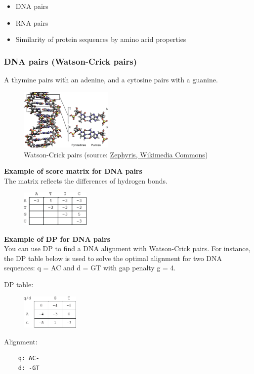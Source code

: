 \begin{itemize}
\item DNA pairs
\item RNA pairs
\item Similarity of protein sequences by amino acid properties
\end{itemize}

%
%
\subsubsection*{DNA pairs (Watson-Crick pairs)}
A thymine pairs with an adenine, and a cytosine pairs with a guanine.

\begin{figure}[H]
  \centering
      \includegraphics[width=0.4\textwidth]{fig03/dna_watson_crick_pair.png}
  \caption{Watson-Crick pairs (source: \href{https://commons.wikimedia.org/w/index.php?curid=15027555}{Zephyris, Wikimedia Commons})}
\end{figure}

\noindent \textbf{Example of score matrix for DNA pairs} \\
\noindent The matrix reflects the differences of hydrogen bonds.

\begin{figure}[H]
  \centering
      \includegraphics[width=0.3\textwidth]{fig03/example_watson_crick_score_matrix.png}
\end{figure}

\noindent \textbf{Example of DP for DNA pairs} \\
\noindent You can use DP to find a DNA alignment with Watson-Crick pairs. For instance, the DP table below is used to solve the optimal alignment for two DNA sequences: q = AC and d = GT with gap penalty g = 4.

\begin{multicols}{2}
DP table:
\begin{figure}[H]
  \centering
      \includegraphics[width=0.25\textwidth]{fig03/example_watson_crick_alignment.png}
\end{figure}

Alignment:
\begin{verbatim}
    q: AC-
    d: -GT
\end{verbatim}

\end{multicols} 

